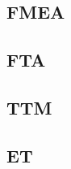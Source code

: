 \subsection{FMEA}
\label{sec:fmea}


\subsection{FTA}
\label{sec:fta}


\subsection{TTM}
\label{sec:ttm}


\subsection{ET}
\label{sec:et}

